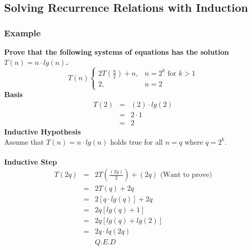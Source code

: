 \subsection{Solving Recurrence Relations with Induction}

\subsubsection{Example}
\textbf{Prove that the following systems of equations has the solution $T(n) = n \cdot lg(n)$.}
$$
T(n) \begin{cases}
	2T(\frac{n}{2}) + n, & n = 2^k \mbox{ for } k > 1\\
	2, & n = 2
\end{cases}
$$
\textbf{Basis}
\begin{eqnarray*}
T(2) &=& (2) \cdot lg(2)\\
	&=& 2 \cdot 1\\
	&=& 2
\end{eqnarray*}
\textbf{Inductive Hypothesis}\\
Assume that $T(n) = n \cdot lg(n)$ holds true for all $n = q$ where $q = 2^k$.\\\\
\textbf{Inductive Step}
\begin{eqnarray*}
	T(2q) &=& 2T(\frac{(2q)}{2}) + (2q) \text{ (Want to prove)}\\
	&=& 2T(q) + 2q\\
	&=& 2\left[q \cdot lg(q)\right] + 2q\\
	&=& 2q\left[lg(q) + 1\right]\\
	&=& 2q\left[lg(q) + lg(2) \right]\\
	&=& 2q \cdot lq(2q)\\
	& & Q.E.D
\end{eqnarray*}